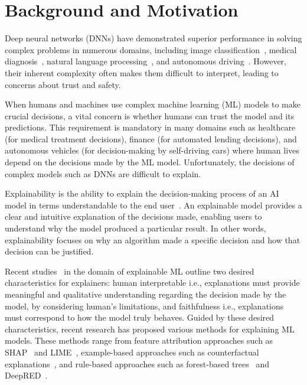 \section{Background and Motivation}
Deep neural networks (DNNs) have demonstrated superior performance in solving complex problems in numerous domains, including image classification~\autocite{s22239544}, medical diagnosis~\autocite{SHAMSHIRBAND2021103627}, natural language processing~\autocite{Wang23}, and autonomous driving~\autocite{s19092064}. However, their inherent complexity often makes them difficult to interpret, leading to concerns about trust and safety.

When humans and machines use complex machine learning (ML) models to make crucial decisions, a vital concern is whether humans can trust the model and its predictions. This requirement is mandatory in many domains such as healthcare (for medical treatment decisions), finance (for automated lending decisions), and autonomous vehicles (for decision-making by self-driving cars) where human lives depend on the decisions made by the ML model. Unfortunately, the decisions of complex models such as DNNs are difficult to explain.

Explainability is the ability to explain the decision-making process of an AI model in terms understandable to the end user~\cite{8631448}. An explainable model provides a clear and intuitive explanation of the decisions made, enabling users to understand why the model produced a particular result. In other words, explainability focuses on why an algorithm made a specific decision and how that decision can be justified.

Recent studies~\cite{Ribeiro2018,chan2022comparativestudyfaithfulnessmetrics,Singh1622975}
 in the domain of explainable ML outline two desired characteristics for explainers: human interpretable i.e., explanations must provide meaningful and qualitative understanding regarding the decision made by the model, by considering human’s limitations, and faithfulness i.e., explanations must correspond to how the model truly behaves. Guided by these desired characteristics, recent research has proposed various methods for explaining ML models. These methods range from feature attribution approaches such as SHAP~\cite{lundberg2017unifiedapproachinterpretingmodel} and LIME~\cite{Ribeiro2018}, example-based approaches such as counterfactual explanations~\cite{wachter2018CE}, and rule-based approaches such as forest-based trees~\cite{SAGI2020124} and DeepRED~\cite{wachter2018CE}.


